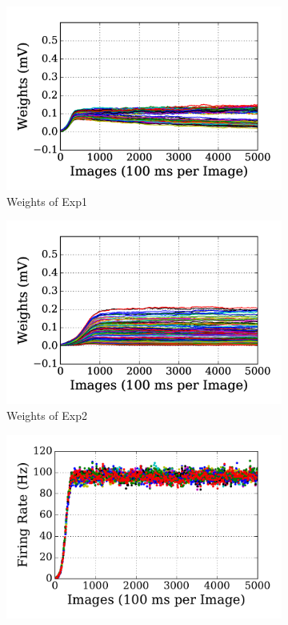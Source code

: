 \begin{figure}
	\centering
	\begin{subfigure}[t]{0.48\textwidth}
		\includegraphics[width=\textwidth]{pics_sdlm/13_exp_SRBM_noise_long/exp1_weights_s.png}
		\caption{Weights of Exp1}
	\end{subfigure}
	\begin{subfigure}[t]{0.48\textwidth}
		\includegraphics[width=\textwidth]{pics_sdlm/13_exp_SRBM_noise_long/exp2_weights_s.png}
		\caption{Weights of Exp2}
	\end{subfigure}
	\begin{subfigure}[t]{0.48\textwidth}
		\includegraphics[width=\textwidth]{pics_sdlm/13_exp_SRBM_noise_long/exp1_recon_s.pdf}

\end{subfigure}
\end{figure}

